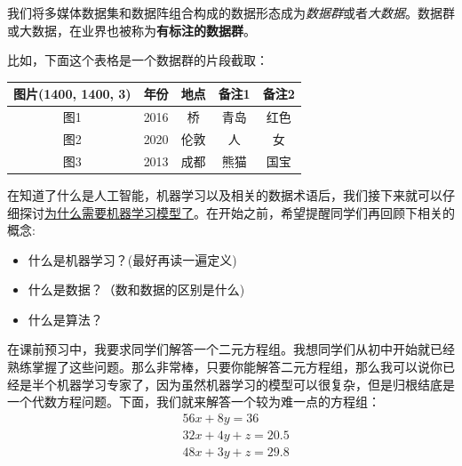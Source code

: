 \documentclass[12pt]{article}
\numberwithin{figure}{section}
\newenvironment{fullmodel}{
			\smallskip\noindent
			\begin{minipage}{\textwidth+\marginparwidth+\marginparsep}\smallskip\smallskip}
			{\smallskip\smallskip\end{minipage}\vspace{.1in}
			}
\numberwithin{equation}{section}
\begin{document}
\begin{definition}
	我们将多媒体数据集和数据阵组合构成的数据形态成为\textit{数据群}或者\textit{大数据}。数据群或大数据，在业界也被称为\textbf{有标注的数据群}。
\end{definition}

\begin{example}
比如，下面这个表格是一个数据群的片段截取：
\begin{table}[H]
	\centering
	\renewcommand{\arraystretch}{1.5}
	\begin{tabular}{ccccc}
	\hline 
		图片(1400, 1400, 3) & 年份 & 地点 & 备注1 & 备注2 \\
		\hline 
		图1 & 2016 & 桥 & 青岛 & 红色 \\
		图2 & 2020 &  伦敦 & 人 & 女 \\
		图3 & 2013 & 成都& 熊猫 & 国宝\\
		\hline 
	\end{tabular}
\end{table}
\end{example}

\begin{fullmodel}
\begin{tcolorbox}[title={掌握基本术语后的`飞翔’}]
	在知道了什么是人工智能，机器学习以及相关的数据术语后，我们接下来就可以仔细探讨\underline{为什么需要机器学习模型了}。在开始之前，希望提醒同学们再回顾下相关的概念:
	\begin{itemize}
		\item 什么是机器学习？(最好再读一遍定义)
		\item 什么是数据？（数和数据的区别是什么)
		\item 什么是算法？
	\end{itemize}
\end{tcolorbox}
\end{fullmodel}

在课前预习中，我要求同学们解答一个二元方程组。我想同学们从初中开始就已经熟练掌握了这些问题。那么非常棒，只要你能解答二元方程组，那么我可以说你已经是半个机器学习专家了，因为虽然机器学习的模型可以很复杂，但是归根结底是一个代数方程问题。下面，我们就来解答一个较为难一点的方程组：
\begin{align*}
	& 56x + 8 y = 36 \\
	& 32 x + 4 y + z = 20.5 \\
	& 48 x + 3y + z = 29.8 
\end{align*}
\end{document}
